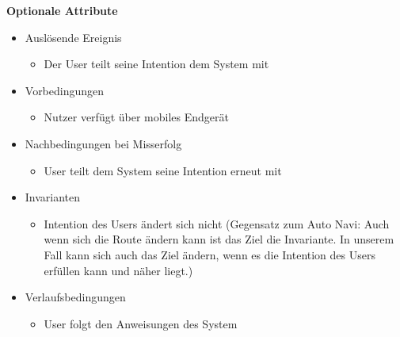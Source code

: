\textbf{Optionale Attribute}
\begin{itemize}
\item Auslösende Ereignis
    \begin{itemize}
    \item Der User teilt seine Intention dem System mit
    \end{itemize}
\item Vorbedingungen
    \begin{itemize}
    \item Nutzer verfügt über mobiles Endgerät
    \end{itemize}
\item Nachbedingungen bei Misserfolg
    \begin{itemize}
    \item User teilt dem System seine Intention erneut mit
    \end{itemize}
\item Invarianten
    \begin{itemize}
    \item Intention des Users ändert sich nicht (Gegensatz zum Auto Navi: Auch wenn sich die Route ändern kann ist das Ziel die Invariante. In unserem Fall kann sich auch das Ziel ändern, wenn es die Intention des Users erfüllen kann und näher liegt.)
    \end{itemize}
\item Verlaufsbedingungen
    \begin{itemize}
    \item User folgt den Anweisungen des System
    \end{itemize}
\end{itemize}

